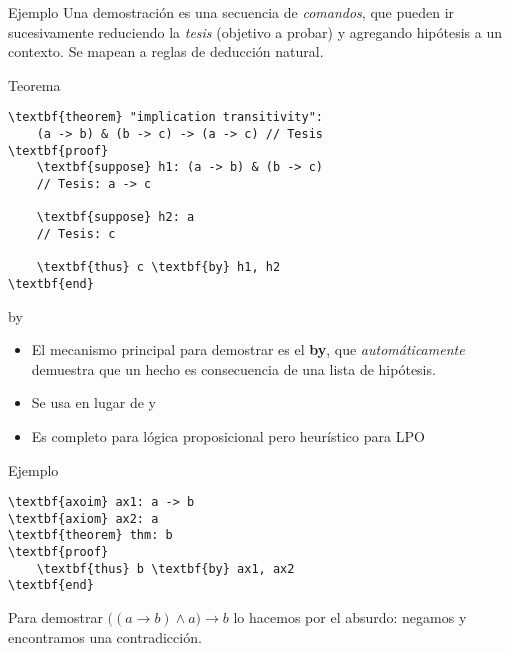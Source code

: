 \documentclass[xcolor={dvipsnames},spanish]{beamer}
\begin{document}
\begin{frame}[fragile]{Ejemplo}
    Una demostración es una secuencia de \textit{comandos}, que pueden ir sucesivamente reduciendo la \textit{tesis} (objetivo a probar) y agregando hipótesis a un contexto. Se mapean a reglas de deducción natural.

\begin{block}{Teorema}
    \begin{Verbatim}[commandchars=\\\{\}]
\textbf{theorem} "implication transitivity":
    (a -> b) & (b -> c) -> (a -> c) // Tesis
\textbf{proof}        
    \textbf{suppose} h1: (a -> b) & (b -> c)
    // Tesis: a -> c
    
    \textbf{suppose} h2: a
    // Tesis: c
    
    \textbf{thus} c \textbf{by} h1, h2
\textbf{end}
\end{Verbatim}

\end{block}
\end{frame}

\begin{frame}{by}
    \begin{itemize}
        \item El mecanismo principal para demostrar es el \textbf{by}, que \textit{automáticamente} demuestra que un hecho es consecuencia de una lista de hipótesis.
        \item Se usa en lugar de  y 
        \item Es completo para lógica proposicional pero heurístico para LPO
    \end{itemize}
\end{frame}

\begin{frame}[fragile]{Ejemplo}
\begin{block}{}
\begin{Verbatim}[commandchars=\\\{\}]
\textbf{axoim} ax1: a -> b
\textbf{axiom} ax2: a
\textbf{theorem} thm: b
\textbf{proof}
    \textbf{thus} b \textbf{by} ax1, ax2
\textbf{end}
\end{Verbatim}    
\end{block}

Para demostrar $\big( (a \to b) \wedge a \big) \to b$ lo hacemos por el absurdo: negamos y encontramos una contradicción.
\end{frame}
\end{document}
